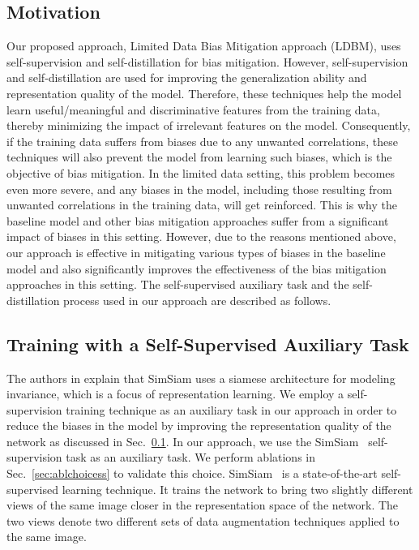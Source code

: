 \documentclass[10pt,twocolumn,letterpaper]{article}
\begin{document}
 \subsection{Motivation}\label{sec:motivation}
Our proposed approach, Limited Data Bias Mitigation approach (LDBM), uses self-supervision and self-distillation for bias mitigation. However, self-supervision and self-distillation are used for improving the generalization ability and representation quality of the model. Therefore, these techniques help the model learn useful/meaningful and discriminative features from the training data, thereby minimizing the impact of irrelevant features on the model. Consequently, if the training data suffers from biases due to any unwanted correlations, these techniques will also prevent the model from learning such biases, which is the objective of bias mitigation. In the limited data setting, this problem becomes even more severe, and any biases in the model, including those resulting from unwanted correlations in the training data, will get reinforced. This is why the baseline model and other bias mitigation approaches suffer from a significant impact of biases in this setting. However, due to the reasons mentioned above, our approach is effective in mitigating various types of biases in the baseline model and also significantly improves the effectiveness of the bias mitigation approaches in this setting. The self-supervised auxiliary task and the self-distillation process used in our approach are described as follows.


\subsection{Training with a Self-Supervised Auxiliary Task}
The authors in \cite{chen2020exploring} explain that SimSiam uses a siamese architecture for modeling invariance, which is a focus of representation learning. We employ a self-supervision training technique as an auxiliary task in our approach in order to reduce the biases in the model by improving the representation quality of the network as discussed in Sec.~\ref{sec:motivation}. In our approach, we use the SimSiam~\cite{chen2020exploring} self-supervision task as an auxiliary task. We perform ablations in Sec.~\ref{sec:ablchoicess} to validate this choice. SimSiam~\cite{chen2020exploring} is a state-of-the-art self-supervised learning technique. It trains the network to bring two slightly different views of the same image closer in the representation space of the network. The two views denote two different sets of data augmentation techniques applied to the same image. 
\end{document}
